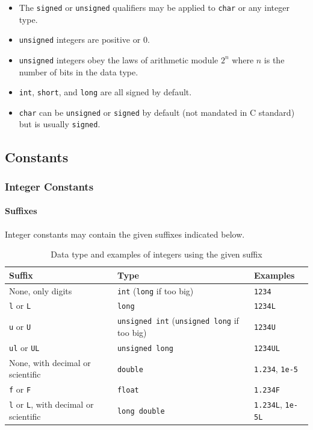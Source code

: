 \documentclass{article}
\newcommand{\code}[1]{\texttt{#1}}
\begin{document}
\begin{itemize}
    \item The \code{signed} or \code{unsigned} qualifiers may be applied to \code{char} or any integer type.
    \item \code{unsigned} integers are positive or 0.
    \item \code{unsigned} integers obey the laws of arithmetic module $2^n$ where $n$ is the number of bits in the data type.
    \item \code{int}, \code{short}, and \code{long} are all signed by default.
    \item \code{char} can be \code{unsigned} or \code{signed} by default (not mandated in C standard) but is usually \code{signed}.
\end{itemize}

\subsection{Constants}

\subsubsection{Integer Constants}

\paragraph{Suffixes} Integer constants may contain the given suffixes indicated below.

\begin{table}[H]
    \centering
    \begin{tabular}{|p{4cm}|p{4cm}|l|}
        \hline
        \textbf{Suffix} & \textbf{Type} & \textbf{Examples} \\
        \hline
        None, only digits & \code{int} (\code{long} if too big) & \code{1234} \\
        \code{l} or \code{L} & \code{long} & \code
        {1234L} \\
        \code{u} or \code{U} & \code{unsigned int} (\code{unsigned long} if too big) & \code{1234U} \\
        \code{ul} or \code{UL} & \code{unsigned long} & \code{1234UL} \\
        None, with decimal or scientific & \code{double} & \code{1.234}, \code{1e-5} \\
        \code{f} or \code{F} & \code{float} & \code{1.234F} \\
        \code{l} or \code{L}, with decimal or scientific & \code{long double} & \code{1.234L}, \code{1e-5L} \\
        \hline
    \end{tabular}
    \caption{Data type and examples of integers using the given suffix}
\end{table}
\end{document}
